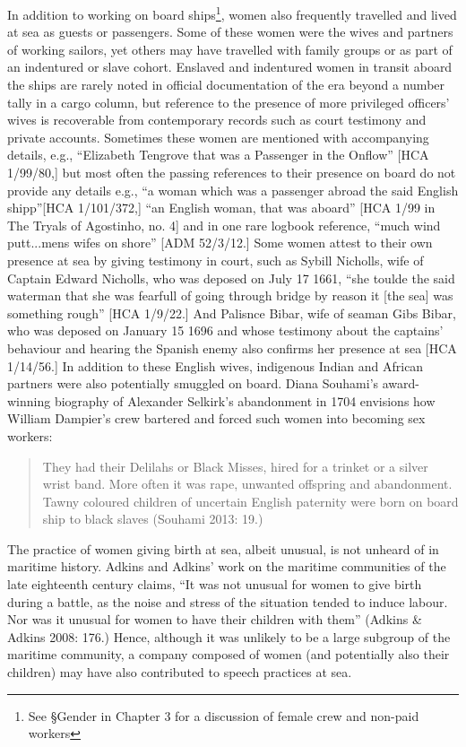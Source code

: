 \documentclass[12pt]{article}
\newenvironment{styleStandard}{\renewcommand\baselinestretch{1.0}\setlength\leftskip{0cm}\setlength\rightskip{0cm plus 1fil}\setlength\parindent{0cm}\setlength\parfillskip{0pt plus 1fil}\setlength\parskip{0in plus 1pt}\writerlistparindent\writerlistleftskip\leavevmode\normalfont\normalsize\writerlistlabel\ignorespaces}{\unskip\vspace{0in plus 1pt}\par}
\newcommand\writerlistleftskip{}
\newcommand\writerlistparindent{}
\newcommand\writerlistlabel{}
\begin{document}
\begin{styleStandard}
In addition to working on board ships\footnote{ See §Gender in Chapter 3 for a discussion of female crew and non-paid workers}, women also frequently travelled and lived at sea as guests or passengers. Some of these women were the wives and partners of working sailors, yet others may have travelled with family groups or as part of an indentured or slave cohort. Enslaved and indentured women in transit aboard the ships are rarely noted in official documentation of the era beyond a number tally in a cargo column, but reference to the presence of more privileged officers’ wives is recoverable from contemporary records such as court testimony and private accounts. Sometimes these women are mentioned with accompanying details, e.g., “Elizabeth Tengrove that was a Passenger in the Onflow” [HCA 1/99/80,] but most often the passing references to their presence on board do not provide any details e.g., “a woman which was a passenger abroad the said English shipp”[HCA 1/101/372,] “an English woman, that was aboard” [HCA 1/99 in The Tryals of Agostinho, no. 4] and in one rare logbook reference, “much wind putt...mens wifes on shore” [ADM 52/3/12.] Some women attest to their own presence at sea by giving testimony in court, such as Sybill Nicholls, wife of Captain Edward Nicholls, who was deposed on July 17 1661, “she toulde the said waterman that she was fearfull of going through bridge by reason it [the sea] was something rough” [HCA 1/9/22.] And Palisnce Bibar, wife of seaman Gibs Bibar, who was deposed on January 15 1696 and whose testimony about the captain{\textquotesingle}s’ behaviour and hearing the Spanish enemy also confirms her presence at sea [HCA 1/14/56.] In addition to these English wives, indigenous Indian and African partners were also potentially smuggled on board. Diana Souhami’s award-winning biography of Alexander Selkirk’s abandonment in 1704 envisions how William Dampier’s crew bartered and forced such women into becoming sex workers:
\end{styleStandard}


\begin{quotation}
They had their Delilahs or Black Misses, hired for a trinket or a silver wrist band. More often it was rape, unwanted offspring and abandonment. Tawny coloured children of uncertain English paternity were born on board ship to black slaves (Souhami 2013: 19.)

\end{quotation}
\begin{styleStandard}
The practice of women giving birth at sea, albeit unusual, is not unheard of in maritime history. Adkins and Adkins’ work on the maritime communities of the late eighteenth century claims, “It was not unusual for women to give birth during a battle, as the noise and stress of the situation tended to induce labour. Nor was it unusual for women to have their children with them” (Adkins \& Adkins 2008: 176.) Hence, although it was unlikely to be a large subgroup of the maritime community, a company composed of women (and potentially also their children) may have also contributed to speech practices at sea. 
\end{styleStandard}
\end{document}

